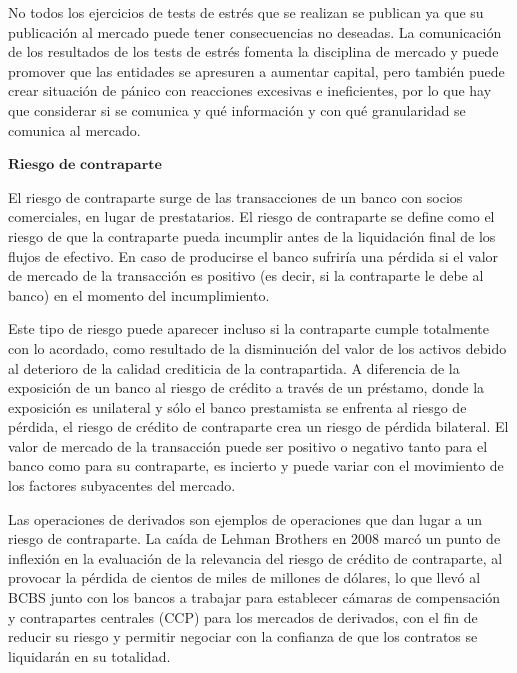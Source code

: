 \documentclass[10pt,a4paper]{article}
\begin{document}
No todos los ejercicios de tests de estrés que se realizan se publican ya que su publicación al mercado puede tener consecuencias no deseadas. La comunicación de los resultados de los tests de estrés fomenta la disciplina de mercado y puede promover que las entidades se apresuren a aumentar capital, pero también puede crear situación de pánico con reacciones excesivas e ineficientes, por lo que hay que considerar si se comunica y qué información y con qué granularidad se comunica al mercado.

$\textbf{Riesgo de contraparte}$

El riesgo de contraparte surge de las transacciones de un banco con socios comerciales, en lugar de prestatarios. El riesgo de contraparte se define como el riesgo de que la contraparte pueda incumplir antes de la liquidación final de los flujos de efectivo. En caso de producirse el banco sufriría una pérdida si el valor de mercado de la transacción es positivo (es decir, si la contraparte le debe al banco) en el momento del incumplimiento. 
    
Este tipo de riesgo puede aparecer incluso si la contraparte cumple totalmente con lo acordado, como resultado de la disminución del valor de los activos debido al deterioro de la calidad crediticia de la contrapartida. A diferencia de la exposición de un banco al riesgo de crédito a través de un préstamo, donde la exposición es unilateral y sólo el banco prestamista se enfrenta al riesgo de pérdida, el riesgo de crédito de contraparte crea un riesgo de pérdida bilateral. El valor de mercado de la transacción puede ser positivo o negativo tanto para el banco como para su contraparte, es incierto y puede variar con el movimiento de los factores subyacentes del mercado. 
    
Las operaciones de derivados son ejemplos de operaciones que dan lugar a un riesgo de contraparte. La caída de Lehman Brothers en 2008 marcó un punto de inflexión en la evaluación de la relevancia del riesgo de crédito de contraparte, al provocar la pérdida de cientos de miles de millones de dólares, lo que llevó al BCBS junto con los bancos a trabajar para establecer cámaras de compensación y contrapartes centrales (CCP) para los mercados de derivados, con el fin de reducir su riesgo y permitir negociar con la confianza de que los contratos se liquidarán en su totalidad.
\end{document}
